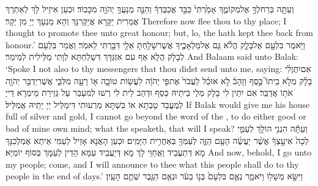 {וְעַתָּ֖ה בְּרַח\maqqaf לְךָ֣ אֶל\maqqaf מְקוֹמֶ֑ךָ אָמַ֙רְתִּי֙ כַּבֵּ֣ד אֲכַבֶּדְךָ֔ וְהִנֵּ֛ה מְנָעֲךָ֥ יְהֹוָ֖ה מִכָּבֽוֹד׃}
{וּכְעַן אִיזֵיל לָךְ לְאַתְרָךְ אֲמַרִית יַקָּרָא אֲיַקְּרִנָּךְ וְהָא מַנְעָךְ יְיָ מִן יְקָר׃}
{Therefore now flee thou to thy place; I thought to promote thee unto great honour; but, lo, the \lord\space hath kept thee back from honour.’}{}
{וַיֹּ֥אמֶר בִּלְעָ֖ם אֶל\maqqaf בָּלָ֑ק הֲלֹ֗א גַּ֧ם אֶל\maqqaf מַלְאָכֶ֛יךָ אֲשֶׁר\maqqaf שָׁלַ֥חְתָּ אֵלַ֖י דִּבַּ֥רְתִּי לֵאמֹֽר׃}
{וַאֲמַר בִּלְעָם לְבָלָק הֲלָא אַף עִם אִזְגַּדָּךְ דִּשְׁלַחְתָּא לְוָתִי מַלֵּילִית לְמֵימַר׃}
{And Balaam said unto Balak: ‘Spoke I not also to thy messengers that thou didst send unto me, saying:}{}
{אִם\maqqaf יִתֶּן\maqqaf לִ֨י בָלָ֜ק מְלֹ֣א בֵיתוֹ֮ כֶּ֣סֶף וְזָהָב֒ לֹ֣א אוּכַ֗ל לַעֲבֹר֙ אֶת\maqqaf פִּ֣י יְהֹוָ֔ה לַעֲשׂ֥וֹת טוֹבָ֛ה א֥וֹ רָעָ֖ה מִלִּבִּ֑י אֲשֶׁר\maqqaf יְדַבֵּ֥ר יְהֹוָ֖ה אֹת֥וֹ אֲדַבֵּֽר׃}
{אִם יִתֵּין לִי בָלָק מְלֵי בֵיתֵיהּ כְּסַף וּדְהַב לֵית לִי רְשׁוּ לְמִעְבַּר עַל גְּזֵירַת מֵימְרָא דַּייָ לְמֶעֱבַד טָבְתָא אוֹ בִּשְׁתָּא מֵרְעוּתִי דִּימַלֵּיל יְיָ יָתֵיהּ אֲמַלֵּיל׃}
{If Balak would give me his house full of silver and gold, I cannot go beyond the word of the \lord, to do either good or bad of mine own mind; what the \lord\space speaketh, that will I speak?}{}
{וְעַתָּ֕ה הִנְנִ֥י הוֹלֵ֖ךְ לְעַמִּ֑י לְכָה֙ אִיעָ֣צְךָ֔ אֲשֶׁ֨ר יַעֲשֶׂ֜ה הָעָ֥ם הַזֶּ֛ה לְעַמְּךָ֖ בְּאַחֲרִ֥ית הַיָּמִֽים׃}
{וּכְעַן הָאֲנָא אָזֵיל לְעַמִּי אֵיתַא אֶמְלְכִנָּךְ מָא דְּתַעֲבֵיד וַאֲחַוֵּי לָךְ מָא דְּיַעֲבֵיד עַמָּא הָדֵין לְעַמָּךְ בְּסוֹף יוֹמַיָּא׃}
{And now, behold, I go unto my people; come, and I will announce to thee what this people shall do to thy people in the end of days.’}{}
{וַיִּשָּׂ֥א מְשָׁל֖וֹ וַיֹּאמַ֑ר נְאֻ֤ם בִּלְעָם֙ בְּנ֣וֹ בְעֹ֔ר וּנְאֻ֥ם הַגֶּ֖בֶר שְׁתֻ֥ם הָעָֽיִן׃}
